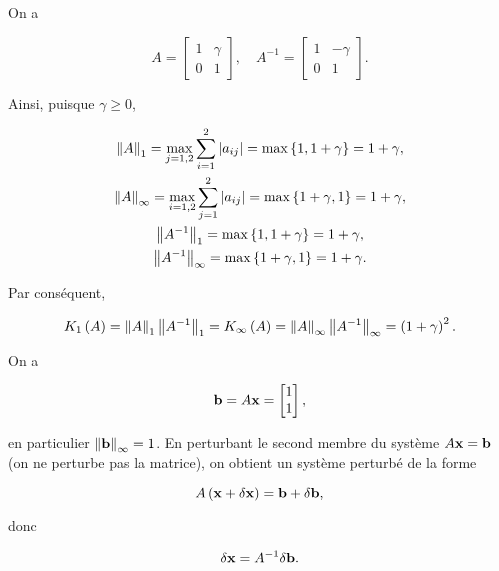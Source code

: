 On a 

\begin{equation*}
  A = \begin{bmatrix}
        1 & \gamma  \\
        0 & 1
      \end{bmatrix}
  , \quad
  A^{-1} = \begin{bmatrix}
        1 & - \gamma  \\
        0 & 1
      \end{bmatrix}.
\end{equation*}

Ainsi, puisque $\gamma \geq 0$,

\begin{gather*}
  \left\lVert A\right\rVert_{1} = \max_{j = 1, 2} \sum_{i = 1}^{2} \left\lvert a_{ij}\right\rvert = \max \left\{1, 1 + \gamma\right\} = 1 + \gamma, \\
  \left\lVert A\right\rVert_{\infty} = \max_{i = 1, 2} \sum_{j = 1}^{2} \left\lvert a_{ij}\right\rvert = \max \left\{1 + \gamma, 1\right\} = 1 + \gamma, \\
  \left\lVert A^{-1}\right\rVert_{1} = \max \left\{1, 1 + \gamma\right\} = 1 + \gamma, \\
  \left\lVert A^{-1}\right\rVert_{\infty} = \max \left\{1 + \gamma, 1\right\} = 1 + \gamma.
\end{gather*}

Par conséquent,

\begin{equation*}
  K_{1} \left(A\right)
  = \left\lVert A\right\rVert_{1} \left\lVert A^{-1}\right\rVert_{1} 
  = K_{\infty} \left(A\right)
  = \left\lVert A\right\rVert_{\infty} \left\lVert A^{-1}\right\rVert_{\infty}
  = \left(1 + \gamma\right)^{2}. 
\end{equation*}

On a

\begin{equation*}
  \mathbf{b} = A \mathbf{x} = \begin{bmatrix}
        1   \\
        1
      \end{bmatrix},
\end{equation*}

en particulier $\left\lVert\mathbf{b}\right\rVert_{\infty} = 1$. 
En perturbant le second membre du système $A \mathbf{x} = \mathbf{b}$ (on ne perturbe pas la matrice), on obtient un système perturbé de la forme

\begin{equation*}
  A \left(\mathbf{x} + \delta \mathbf{x}\right) = \mathbf{b} + \delta \mathbf{b},
\end{equation*}

donc

\begin{equation*}
  \delta \mathbf{x} = A^{-1} \delta \mathbf{b}.
\end{equation*}

